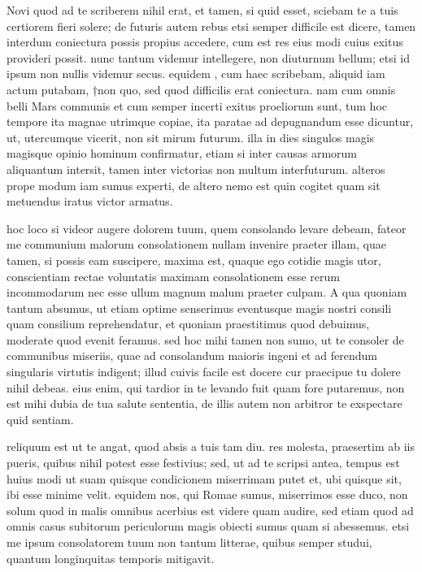 


 Novi quod ad te scriberem nihil erat, et tamen, si quid esset, sciebam te a tuis certiorem fieri solere; de futuris autem rebus etsi semper difficile est dicere, tamen interdum coniectura possis propius accedere, cum est res eius modi cuius exitus provideri possit. nunc tantum videmur intellegere, non diuturnum bellum; etsi id ipsum non nullis videmur secus. equidem , cum haec scribebam, aliquid iam actum putabam, †non quo, sed quod difficilis erat coniectura. nam cum omnis belli Mars communis et cum semper incerti exitus proeliorum sunt, tum hoc tempore ita magnae utrimque copiae, ita paratae ad depugnandum esse dicuntur, ut, utercumque vicerit, non sit mirum futurum. illa in dies singulos magis magisque opinio hominum confirmatur, etiam si inter causas armorum aliquantum intersit, tamen inter victorias non multum interfuturum. alteros prope modum iam sumus experti, de altero nemo est quin cogitet quam sit metuendus iratus victor armatus.

 hoc loco si videor augere dolorem tuum, quem consolando levare debeam, fateor me communium malorum consolationem nullam invenire praeter illam, quae tamen, si possis eam suscipere, maxima est, quaque ego cotidie magis utor, conscientiam rectae voluntatis maximam consolationem esse rerum incommodarum nec esse ullum magnum malum praeter culpam. A qua quoniam tantum absumus, ut etiam optime senserimus eventusque magis nostri consili quam consilium reprehendatur, et quoniam praestitimus quod debuimus, moderate quod evenit feramus. sed hoc mihi tamen non sumo, ut te consoler de communibus miseriis, quae ad consolandum maioris ingeni et ad ferendum singularis virtutis indigent; illud cuivis facile est docere cur praecipue tu dolere nihil debeas. eius enim, qui tardior in te levando fuit quam fore putaremus, non est mihi dubia de tua salute sententia, de illis autem non arbitror te exspectare quid sentiam.

 reliquum est ut te angat, quod absis a tuis tam diu. res molesta, praesertim ab iis pueris, quibus nihil potest esse festivius; sed, ut ad te scripsi antea, tempus est huius modi ut suam quisque condicionem miserrimam putet et, ubi quisque sit, ibi esse minime velit. equidem nos, qui Romae sumus, miserrimos esse duco, non solum quod in malis omnibus acerbius est videre quam audire, sed etiam quod ad omnis casus subitorum periculorum magis obiecti sumus quam si abessemus. etsi me ipsum consolatorem tuum non tantum litterae, quibus semper studui, quantum longinquitas temporis mitigavit.

